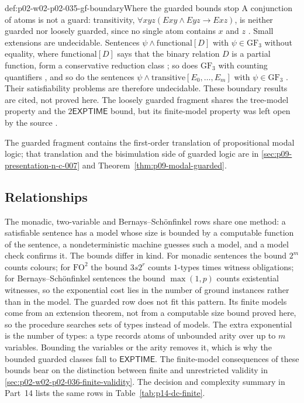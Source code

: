 \begin{hbwarning}{def:p02-w02-p02-035-gf-boundary}{Where the guarded bounds stop}
A conjunction of atoms is not a guard: transitivity,
\(\forall xyz(Exy\land Eyz\to Exz)\), is neither guarded nor loosely guarded,
since no single atom contains \(x\) and \(z\)
\cite[sect.~2]{Gradel1999}.  Small extensions are undecidable.  Sentences
\(\psi\land\mathrm{functional}[D]\) with \(\psi\in\mathrm{GF}_3\) without
equality, where \(\mathrm{functional}[D]\) says that the binary relation \(D\)
is a partial function, form a conservative reduction class
\cite[thm.~5.8]{Gradel1999}; so does \(\mathrm{GF}_3\) with counting
quantifiers \cite[cor.~5.9]{Gradel1999}, and so do the sentences
\(\psi\land\mathrm{transitive}[E_0,\ldots,E_m]\) with \(\psi\in\mathrm{GF}_3\)
\cite[thm.~5.10]{Gradel1999}.  Their satisfiability problems are therefore
undecidable.  These boundary results are cited, not proved here.  The
loosely guarded fragment shares the tree-model property and the
\(2\mathsf{EXPTIME}\) bound, but its finite-model property was left open by
the source \cite[remark after thm.~3.10]{Gradel1999}.
\end{hbwarning}

The guarded fragment contains the first-order translation of propositional modal
logic; that translation and the bisimulation side of guarded logic are in
\cref{sec:p09-presentation-n-c-007} and
Theorem~\ref{thm:p09-modal-guarded}.

\subsection{Relationships}
\label{sec:p02-w02-p02-035-relationships}

The monadic, two-variable and Bernays--Sch\"onfinkel rows share one method: a satisfiable sentence has a model whose
size is bounded by a computable function of the sentence, a nondeterministic
machine guesses such a model, and a model check confirms it.  The bounds
differ in kind.  For monadic sentences the bound \(2^m\) counts colours; for
\(\mathrm{FO}^2\) the bound \(3s2^r\) counts \(1\)-types times witness
obligations; for Bernays--Sch\"onfinkel sentences the bound \(\max(1,p)\)
counts existential witnesses, so the exponential cost lies in the number of
ground instances rather than in the model.  The guarded row does not fit this
pattern.  Its finite models come from an extension theorem, not from a
computable size bound proved here, so the procedure searches sets of types
instead of models.  The extra exponential is the number of types: a type
records atoms of unbounded arity over up to \(m\) variables.  Bounding the
variables or the arity removes it, which is why the bounded guarded classes
fall to \(\mathsf{EXPTIME}\).  The finite-model consequences of
these bounds bear on the distinction between finite and unrestricted validity
in \cref{sec:p02-w02-p02-036-finite-validity}.  The decision and complexity
summary in Part~14 lists the same rows in Table~\ref{tab:p14-dc-finite}.
